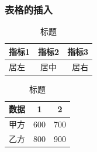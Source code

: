 \documentclass[UTF8]{ctexart}
\begin{document}
	\subsubsection{表格的插入}
	
	\begin{table}[!htbp]
		\centering
		\caption{标题}
		\begin{tabular}{|l|c|r|}
			
			\hline
			指标1&指标2&指标3\\
			\hline
			居左&居中&居右\\
			\hline
		\end{tabular}
	\end{table}
	
	
	\begin{table}[!htbp]
		\centering
		\caption{标题}
		\begin{tabular}{ccc}
			\toprule
			数据&1&2\\
			\midrule
			甲方&600&700\\
			乙方&800&900\\
			\bottomrule
		\end{tabular}
	\end{table}
\end{document}
